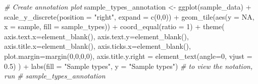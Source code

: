 \documentclass[
]{book}
\newenvironment{Shaded}{\begin{snugshade}}{\end{snugshade}}
\newcommand{\AttributeTok}[1]{\textcolor[rgb]{0.77,0.63,0.00}{#1}}
\newcommand{\CommentTok}[1]{\textcolor[rgb]{0.56,0.35,0.01}{\textit{#1}}}
\newcommand{\ConstantTok}[1]{\textcolor[rgb]{0.00,0.00,0.00}{#1}}
\newcommand{\DecValTok}[1]{\textcolor[rgb]{0.00,0.00,0.81}{#1}}
\newcommand{\FloatTok}[1]{\textcolor[rgb]{0.00,0.00,0.81}{#1}}
\newcommand{\FunctionTok}[1]{\textcolor[rgb]{0.00,0.00,0.00}{#1}}
\newcommand{\NormalTok}[1]{#1}
\newcommand{\OtherTok}[1]{\textcolor[rgb]{0.56,0.35,0.01}{#1}}
\newcommand{\SpecialCharTok}[1]{\textcolor[rgb]{0.00,0.00,0.00}{#1}}
\newcommand{\StringTok}[1]{\textcolor[rgb]{0.31,0.60,0.02}{#1}}
\begin{document}
\begin{Shaded}
\begin{Highlighting}[]
\CommentTok{\# Create annotation plot}
\NormalTok{sample\_types\_annotation }\OtherTok{\textless{}{-}} \FunctionTok{ggplot}\NormalTok{(sample\_data) }\SpecialCharTok{+} \FunctionTok{scale\_y\_discrete}\NormalTok{(}\AttributeTok{position =} \StringTok{"right"}\NormalTok{, }\AttributeTok{expand =} \FunctionTok{c}\NormalTok{(}\DecValTok{0}\NormalTok{,}\DecValTok{0}\NormalTok{)) }\SpecialCharTok{+}
  \FunctionTok{geom\_tile}\NormalTok{(}\FunctionTok{aes}\NormalTok{(}\AttributeTok{y =} \ConstantTok{NA}\NormalTok{, }\AttributeTok{x =}\NormalTok{ sample, }\AttributeTok{fill =}\NormalTok{ sample\_types)) }\SpecialCharTok{+} \FunctionTok{coord\_equal}\NormalTok{(}\AttributeTok{ratio =} \DecValTok{1}\NormalTok{) }\SpecialCharTok{+}
  \FunctionTok{theme}\NormalTok{(}
        \AttributeTok{axis.text.x=}\FunctionTok{element\_blank}\NormalTok{(),}
        \AttributeTok{axis.text.y=}\FunctionTok{element\_blank}\NormalTok{(),}
        \AttributeTok{axis.title.x=}\FunctionTok{element\_blank}\NormalTok{(),}
        \AttributeTok{axis.ticks.x=}\FunctionTok{element\_blank}\NormalTok{(),}
        \AttributeTok{plot.margin=}\FunctionTok{margin}\NormalTok{(}\DecValTok{0}\NormalTok{,}\DecValTok{0}\NormalTok{,}\DecValTok{0}\NormalTok{,}\DecValTok{0}\NormalTok{),}
        \AttributeTok{axis.title.y.right =} \FunctionTok{element\_text}\NormalTok{(}\AttributeTok{angle=}\DecValTok{0}\NormalTok{, }\AttributeTok{vjust =} \FloatTok{0.5}\NormalTok{)}
\NormalTok{        ) }\SpecialCharTok{+}
      \FunctionTok{labs}\NormalTok{(}\AttributeTok{fill =} \StringTok{"Sample types"}\NormalTok{, }\AttributeTok{y =} \StringTok{"Sample types"}\NormalTok{)}
\CommentTok{\# to view the notation, run}
\CommentTok{\# sample\_types\_annotation}


\end{Highlighting}
\end{Shaded}
\end{document}
